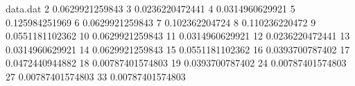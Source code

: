 \begin{filecontents}{data.dat}
	2 0.0629921259843
	3 0.0236220472441
	4 0.0314960629921
	5 0.125984251969
	6 0.0629921259843
	7 0.102362204724
	8 0.110236220472
	9 0.0551181102362
	10 0.0629921259843
	11 0.0314960629921
	12 0.0236220472441
	13 0.0314960629921
	14 0.0629921259843
	15 0.0551181102362
	16 0.0393700787402
	17 0.0472440944882
	18 0.00787401574803
	19 0.0393700787402
	24 0.00787401574803
	27 0.00787401574803
	33 0.00787401574803
\end{filecontents}
